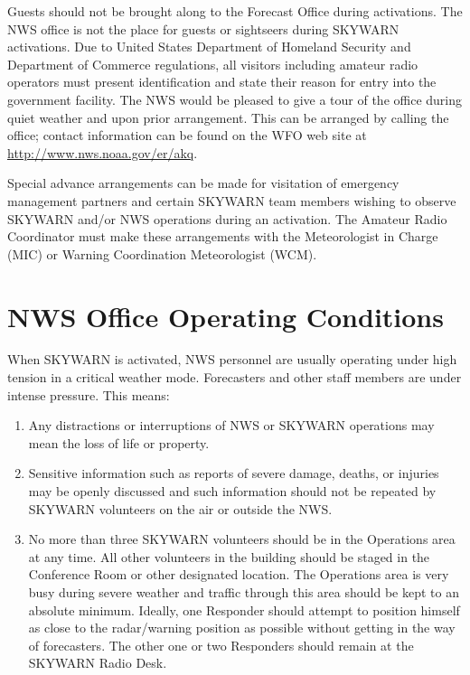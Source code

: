 \documentclass[pdflatex,letterpaper,twoside,12pt]{book}
\begin{document}
Guests should not be brought along to the Forecast Office during activations.  The NWS office is not the place for guests or sightseers during SKYWARN activations.  Due to United States Department of Homeland Security and Department of Commerce regulations, all visitors including amateur radio operators must present identification and state their reason for entry into the government facility.  The NWS would be pleased to give a tour of the office during quiet weather and upon prior arrangement. This can be arranged by calling the office; contact information can be found on the WFO web site at \href{http://www.nws.noaa.gov/er/akq}{http://www.nws.noaa.gov/er/akq}.

Special advance arrangements can be made for visitation of emergency management partners and certain SKYWARN team members wishing to observe SKYWARN and/or NWS operations during an activation. The Amateur Radio Coordinator must make these arrangements with the Meteorologist in Charge (MIC) or Warning Coordination Meteorologist (WCM).


\section{NWS Office Operating Conditions}

When SKYWARN is activated, NWS personnel are usually operating under high tension in a critical weather mode. Forecasters and other staff members are under intense pressure.  This means: 

\begin{enumerate}
\item Any distractions or interruptions of NWS or SKYWARN operations may mean the loss of life or property. 
\item Sensitive information such as reports of severe damage, deaths, or injuries may be openly discussed and such information should not be repeated by SKYWARN volunteers on the air or outside the NWS. 
\item No more than three SKYWARN volunteers should be in the Operations area at any time. All other volunteers in the building should be staged in the Conference Room or other designated location.  The Operations area is very busy during severe weather and traffic through this area should be kept to an absolute minimum. Ideally, one Responder should attempt to position himself as close to the radar/warning position as possible without getting in the way of forecasters.  The other one or two Responders should remain at the SKYWARN Radio Desk.
\end{enumerate}
\end{document}
